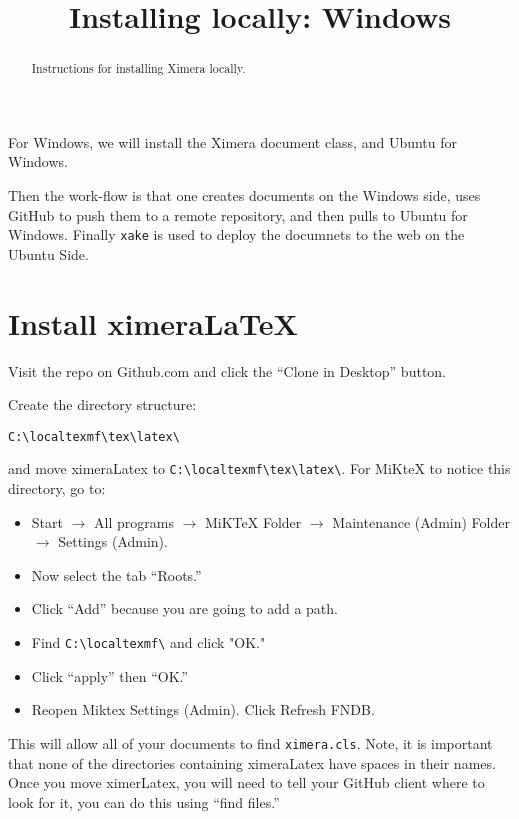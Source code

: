 \documentclass{ximera}
\title{Installing locally: Windows}
\begin{document}
\begin{abstract}
Instructions for installing Ximera locally.
\end{abstract}
\maketitle

For Windows, we will install the Ximera document class, and Ubuntu for Windows.

Then the work-flow is that one creates documents on the Windows side,
uses GitHub to push them to a remote repository, and then pulls to
Ubuntu for Windows. Finally \verb|xake| is used to deploy the
documnets to the web on the Ubuntu Side.


\section{Install ximeraLaTeX}


Visit the repo on Github.com  and click the
``Clone in Desktop'' button.



Create the directory structure:

\begin{verbatim}
C:\localtexmf\tex\latex\
\end{verbatim}

and move ximeraLatex to \verb|C:\localtexmf\tex\latex\|. For MiKteX to notice this
directory, go to:

\begin{itemize}
\item Start $\to$ All programs $\to$ MiKTeX Folder $\to$ Maintenance (Admin) Folder $\to$ Settings (Admin).
\item Now select the tab ``Roots.''
\item Click ``Add'' because you are going to add a path.
\item Find \verb|C:\localtexmf\| and click "OK."
\item Click ``apply'' then ``OK.''
\item Reopen Miktex Settings (Admin). Click Refresh FNDB.
\end{itemize}
This will allow all of your documents to find \verb|ximera.cls|. Note, it is
important that none of the directories containing ximeraLatex have
spaces in their names. Once you move ximerLatex, you will need to tell
your GitHub client where to look for it, you can do this using ``find
files.''
\end{document}

